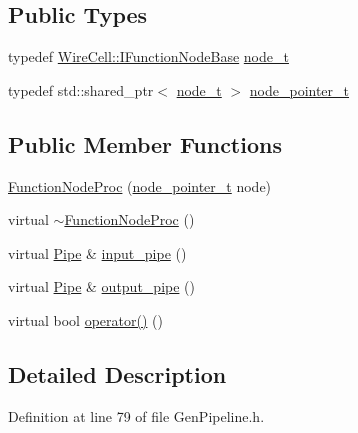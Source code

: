 \subsection*{Public Types}
\begin{DoxyCompactItemize}
\item 
typedef \hyperlink{class_wire_cell_1_1_i_function_node_base}{Wire\+Cell\+::\+I\+Function\+Node\+Base} \hyperlink{class_wire_cell_1_1_function_node_proc_a854111ff4b8d7333c7a4a4a3b52409e6}{node\+\_\+t}
\item 
typedef std\+::shared\+\_\+ptr$<$ \hyperlink{class_wire_cell_1_1_function_node_proc_a854111ff4b8d7333c7a4a4a3b52409e6}{node\+\_\+t} $>$ \hyperlink{class_wire_cell_1_1_function_node_proc_aae8c47d99f259cf8133ef2c071616d41}{node\+\_\+pointer\+\_\+t}
\end{DoxyCompactItemize}
\subsection*{Public Member Functions}
\begin{DoxyCompactItemize}
\item 
\hyperlink{class_wire_cell_1_1_function_node_proc_ad7b2d4e08334acb90a9f406f77c4360a}{Function\+Node\+Proc} (\hyperlink{class_wire_cell_1_1_function_node_proc_aae8c47d99f259cf8133ef2c071616d41}{node\+\_\+pointer\+\_\+t} node)
\item 
virtual \hyperlink{class_wire_cell_1_1_function_node_proc_a10ab7abef41515b35da3175d5c5844d9}{$\sim$\+Function\+Node\+Proc} ()
\item 
virtual \hyperlink{namespace_wire_cell_afce9bb01c731347c3d4c8ca9d4ed804f}{Pipe} \& \hyperlink{class_wire_cell_1_1_function_node_proc_a848ef80dad2daa18d3c6ff85ab0db9e4}{input\+\_\+pipe} ()
\item 
virtual \hyperlink{namespace_wire_cell_afce9bb01c731347c3d4c8ca9d4ed804f}{Pipe} \& \hyperlink{class_wire_cell_1_1_function_node_proc_a6aa2af5dd1edf32d89e1841d4484c77e}{output\+\_\+pipe} ()
\item 
virtual bool \hyperlink{class_wire_cell_1_1_function_node_proc_a3b6d8a5d564ab458fe52b3c69fd284d1}{operator()} ()
\end{DoxyCompactItemize}


\subsection{Detailed Description}


Definition at line 79 of file Gen\+Pipeline.\+h.



